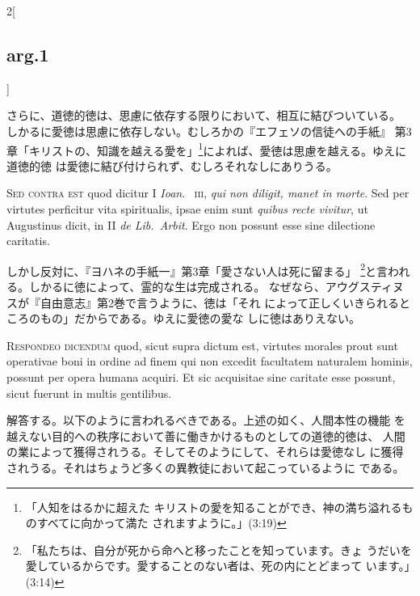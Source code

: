 \documentclass[paper=a4paper,fontsize=10pt,jafontsize=9pt,titlepage]{jlreq}
\begin{document}
\begin{paracol}{2}[\subsection{arg.1}]
\switchcolumn

さらに、道徳的徳は、思慮に依存する限りにおいて、相互に結びついている。
 しかるに愛徳は思慮に依存しない。むしろかの『エフェソの信徒への手紙』
 第3章「キリストの、知識を越える愛を」\footnote{「人知をはるかに超えた
 キリストの愛を知ることができ、神の満ち溢れるものすべてに向かって満た
 されますように。」(3:19)}によれば、愛徳は思慮を越える。ゆえに道徳的徳
 は愛徳に結び付けられず、むしろそれなしにありうる。

\switchcolumn*[\subsection{s.c.}]

{\scshape Sed contra est} quod dicitur I {\itshape Ioan}.~{\scshape
 iii}, {\itshape qui non diligit, manet in morte}. Sed per virtutes
 perficitur vita spiritualis, ipsae enim sunt {\itshape quibus recte
 vivitur}, ut Augustinus dicit, in II {\itshape de Lib.~Arbit}. Ergo
 non possunt esse sine dilectione caritatis.

\switchcolumn

しかし反対に、『ヨハネの手紙一』第3章「愛さない人は死に留まる」
 \footnote{「私たちは、自分が死から命へと移ったことを知っています。きょ
 うだいを愛しているからです。愛することのない者は、死の内にとどまって
 います。」(3:14)}と言われる。しかるに徳によって、霊的な生は完成される。
 なぜなら、アウグスティヌスが『自由意志』第2巻で言うように、徳は「それ
 によって正しくいきられるところのもの」だからである。ゆえに愛徳の愛な
 しに徳はありえない。


{\scshape Respondeo dicendum} quod, sicut supra dictum est, virtutes
 morales prout sunt operativae boni in ordine ad finem qui non excedit
 facultatem naturalem hominis, possunt per opera humana acquiri.  Et
 sic acquisitae sine caritate esse possunt, sicut fuerunt in multis
 gentilibus.

\switchcolumn

解答する。以下のように言われるべきである。上述の如く、人間本性の機能
 を越えない目的への秩序において善に働きかけるものとしての道徳的徳は、
 人間の業によって獲得されうる。そしてそのようにして、それらは愛徳なし
 に獲得されうる。それはちょうど多くの異教徒において起こっているように
 である。

\switchcolumn*


\end{paracol}
\end{document}
